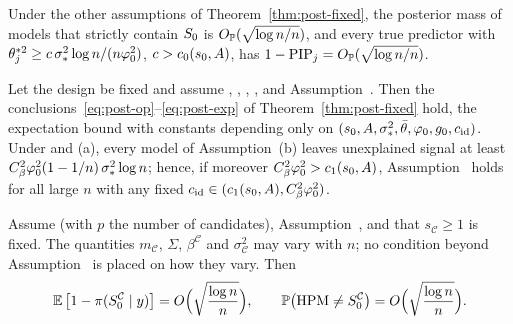 \begin{supprem}\label{rem:no-betamin}
Under the other assumptions of Theorem~\ref{thm:post-fixed}, the posterior mass of models that strictly contain $S_0$ is
$O_{\mathbb{P}}(\sqrt{\log n/n})$, and every true predictor with $\theta_j^{*2}\ge c\,\sigma_*^2\log n/(n\varphi_0^2)$, $c>c_0(s_0,A)$, has
$1-\mathrm{PIP}_j=O_{\mathbb{P}}(\sqrt{\log n/n})$.
\end{supprem}


\begin{suppthm}\label{thm:post-margin}
Let the design be fixed and assume , , , ,  and Assumption~. Then the
conclusions~\eqref{eq:post-op}--\eqref{eq:post-exp} of Theorem~\ref{thm:post-fixed} hold, the expectation bound with
constants depending only on $(s_0,A,\sigma_*^2,\bar\theta,\varphi_0,g_0,c_{\mathrm{id}})$. Under  and (a), every model of Assumption~(b) leaves unexplained signal at least
$C_\beta^2\varphi_0^2(1-1/n)\,\sigma_*^2\log n$; hence, if moreover $C_\beta^2\varphi_0^2>c_1(s_0,A)$, Assumption~
holds for all large $n$ with any fixed $c_{\mathrm{id}}\in(c_1(s_0,A),C_\beta^2\varphi_0^2)$.
\end{suppthm}


\begin{suppthm}\label{thm:omitted}
Assume  (with $p$ the number of candidates), Assumption~, and that $s_{\mathcal C}\ge1$ is fixed. The
quantities $m_{\mathcal C}$, $\Sigma$, $\beta^{\mathcal C}$ and $\sigma^2_{\mathcal C}$ may vary with $n$; no condition beyond
Assumption~ is placed on how they vary. Then
\[
  \operatorname{\mathbb{E}}\big[1-\pi(S_0^{\mathcal C}\mid y)\big]=O\Big(\sqrt{\frac{\log n}{n}}\Big),\qquad
  \mathbb{P}\big(\mathrm{HPM}\neq S_0^{\mathcal C}\big)=O\Big(\sqrt{\frac{\log n}{n}}\Big).
\]
\end{suppthm}


